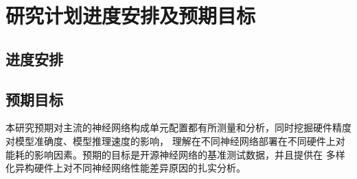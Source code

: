 \section{研究计划进度安排及预期目标}

\subsection{进度安排}

\subsection{预期目标}
本研究预期对主流的神经网络构成单元配置都有所测量和分析，同时挖掘硬件精度对模型准确度、模型推理速度的影响，
理解在不同神经网络部署在不同硬件上对能耗的影响因素。预期的目标是开源神经网络的基准测试数据，并且提供在
多样化异构硬件上对不同神经网络性能差异原因的扎实分析。